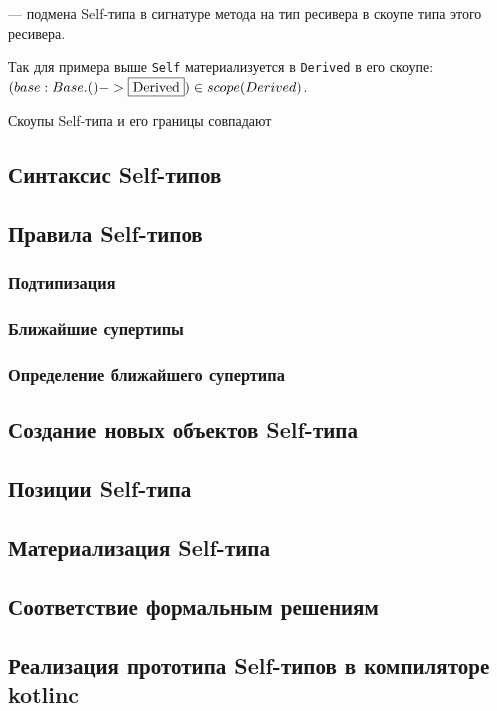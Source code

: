 \begin{definition}
    \label{def:materialization}
     --- подмена Self-типа в сигнатуре метода на тип ресивера в скоупе типа этого ресивера.
\end{definition}

Так для примера выше \texttt{Self} материализуется в \texttt{Derived} в его скоупе: \\
$(base: Base.() -> \framebox{Derived}) \in scope(Derived)$.

Скоупы Self-типа и его границы совпадают %


\subsection{Синтаксис Self-типов}



\subsection{Правила Self-типов}


\subsubsection{Подтипизация}


\subsubsection{Ближайшие супертипы}


\subsubsection{Определение ближайшего супертипа}



\subsection{Создание новых объектов Self-типа}



\subsection{Позиции Self-типа}



\subsection{Материализация Self-типа}



\subsection{Соответствие формальным решениям}



\subsection{Реализация прототипа Self-типов в компиляторе kotlinc}

